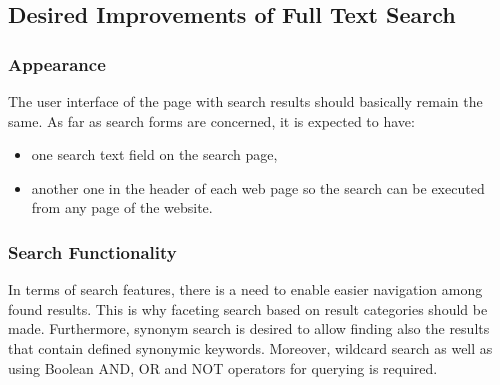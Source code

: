 

\subsection{Desired Improvements of Full Text Search}


\subsubsection{Appearance}

The user interface of the page with search results should basically remain the same. 
As far as search forms are concerned, it is expected to have:

\begin{itemize}
	\item one search text field on the search page,
	\item another one in the header of each web page so the search can be executed from any page of the website.
\end{itemize}

\subsubsection{Search Functionality}

In terms of search features, there is a need to enable easier navigation among found results.
This is why faceting search based on result categories should be made.
Furthermore, synonym search is desired to allow finding also the results that contain defined synonymic keywords.
Moreover, wildcard search as well as using Boolean AND, OR and NOT operators for querying is required.

